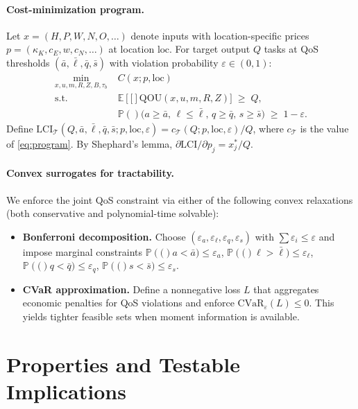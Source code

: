 \documentclass[12pt]{article}
\numberwithin{equation}{section}
\theoremstyle{definition}
\theoremstyle{plain}
\newcommand{\QOU}{\mathrm{QOU}}
\newcommand{\LCI}{\mathrm{LCI}}
\newcommand{\elloc}{\mathrm{loc}}
\newcommand{\EE}[1]{\mathbb{E}\!\left[#1\right]}
\newcommand{\PP}[1]{\mathbb{P}\!\left(#1\right)}
\begin{document}
\paragraph{Cost-minimization program.}
Let $x=(H,P,W,N,O,\dots)$ denote inputs with location-specific prices $p=(\kappa_K,c_E,w,c_N,\dots)$ at location $\elloc$. For target output $Q$ tasks at QoS thresholds $(\bar a,\bar\ell,\bar q,\bar s)$ with violation probability $\varepsilon\in(0,1)$:
\begin{equation}\label{eq:program}
\begin{aligned}
\min_{x,u,m,R,Z,B,\tau_b}\; & C(x;p,\elloc)\\
\text{s.t.}\quad & \EE[\QOU(x,u,m,R,Z)] \;\ge\; Q,\\
& \PP\!\big(a\ge \bar a,\, \ell\le \bar \ell,\, q\ge \bar q,\, s\ge \bar s\big)\;\ge\; 1-\varepsilon.
\end{aligned}
\end{equation}
Define $\LCI_{\mathcal T}(Q,\bar a,\bar\ell,\bar q,\bar s; p,\elloc,\varepsilon)=c_{\mathcal T}(Q;p,\elloc,\varepsilon)/Q$, where $c_{\mathcal T}$ is the value of \eqref{eq:program}. By Shephard’s lemma, $\partial \LCI/\partial p_j = x_j^*/Q$.

\paragraph{Convex surrogates for tractability.}
We enforce the joint QoS constraint via either of the following convex relaxations (both conservative and polynomial-time solvable):
\begin{itemize}
  \item \textbf{Bonferroni decomposition.} Choose $(\varepsilon_a,\varepsilon_\ell,\varepsilon_q,\varepsilon_s)$ with $\sum\varepsilon_i\le\varepsilon$ and impose marginal constraints $\PP(a<\bar a)\le\varepsilon_a$, $\PP(\ell>\bar\ell)\le\varepsilon_\ell$, $\PP(q<\bar q)\le\varepsilon_q$, $\PP(s<\bar s)\le\varepsilon_s$.
  \item \textbf{CVaR approximation.} Define a nonnegative loss $L$ that aggregates economic penalties for QoS violations and enforce $\mathrm{CVaR}_{\varepsilon}(L)\le 0$. This yields tighter feasible sets when moment information is available.
\end{itemize}

\section{Properties and Testable Implications}
\end{document}
